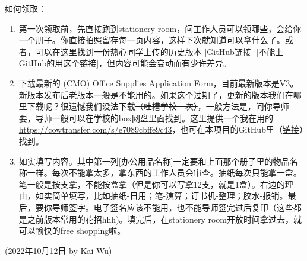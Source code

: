 \hfill\break
如何领取：
\begin{enumerate}
    \item 第一次领取前，先直接跑到stationery room，问工作人员可以领哪些，会给你一个册子。你直接拍照留存每一页内容，这样下次就知道可以拿什么了。或者，可以在这里找到一份热心同学上传的历史版本 \href{https://github.com/kaiwu-astro/xp_pgrs_unofficial_guide/tree/main/fileshare}{[GitHub链接]} \href{https://cowtransfer.com/s/47e3d0942ef340}{[不能上GitHub的用这个链接]}，但内容可能会变动而有少许差异。
    \item 下载最新的 (CMO) Office Supplies Application Form，目前最新版本是V3。新版本发布后老版本一般是不能用的。如果这个过期了，更新的版本我们在哪里下载呢？很遗憾我们没法下载\sout{（吐槽学校一次）}，一般方法是，问你导师要，导师一般可以在学校的box网盘里面找到。这里提供一个我在用的 \url{https://cowtransfer.com/s/e7089cbffe9c43}，也可在本项目的GitHub里（\href{https://github.com/kaiwu-astro/xp_pgrs_unofficial_guide/tree/main/fileshare}{链接}）找到。
    \item 如实填写内容。其中第一列[办公用品名称]一定要和上面那个册子里的物品名称一样。每次不能拿太多，拿东西的工作人员会审查。抽纸每次只能拿一盒。笔一般是按支拿，不能按盒拿（但是你可以写拿12支，就是1盒）。右边的理由，如实简单填写，比如抽纸-日用；笔-演算；订书机-整理；胶水-报销。最后，要你导师签字。电子签名应该不能用，也不能导师签完过后复印（这些都是之前版本常用的花招hhh)。填完后，在stationery room开放时间拿过去，就可以愉快的free shopping啦。
\end{enumerate}


\begin{flushright}
(2022年10月12日 by Kai Wu)
\end{flushright}